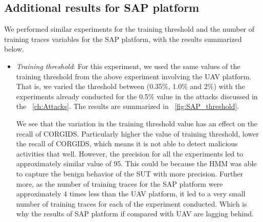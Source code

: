 \subsection{Additional results for SAP platform}
We performed similar experiments for the training threshold and the number of training traces variables for the \ac{SAP} platform, with the results summarized below.

\begin{itemize}
\item \textit{Training threshold}: For this experiment, we used the same values of the training threshold from the above experiment involving the \ac{UAV} platform. That is, we varied the threshold between (0.35\%, 1.0\% and 2\%) with the experiments already conducted for the 0.5\% value in the attacks discussed in the ~\autoref{ch:Attacks}. The results are summarized in ~\autoref{fig:SAP_threshold}.

We see that the variation in the training threshold value has an effect on the recall of \ac{CORGIDS}. Particularly higher the value of training threshold, lower the recall of \ac{CORGIDS}, which means it is not able to detect malicious activities that well. However, the precision for all the experiments led to approximately similar value of 95. This could be because the HMM was able to capture the benign behavior of the \ac{SUT} with more precision. Further more, as the number of training traces for the \ac{SAP} platform were approximately 4 times less than the \ac{UAV} platform, it led to a very small number of training traces for each of the experiment conducted. Which is why the results of \ac{SAP} platform if compared with \ac{UAV} are lagging behind.

\end{itemize}
